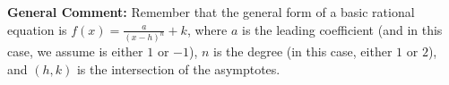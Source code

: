 \documentclass{extbook}[14pt]
\begin{document}
\begin{enumerate}
{\textbf{General Comment:} Remember that the general form of a basic rational equation is $ f(x) = \frac{a}{(x-h)^n} + k$, where $a$ is the leading coefficient (and in this case, we assume is either $1$ or $-1$), $n$ is the degree (in this case, either $1$ or $2$), and $(h, k)$ is the intersection of the asymptotes.
}
\end{enumerate}
\end{document}
